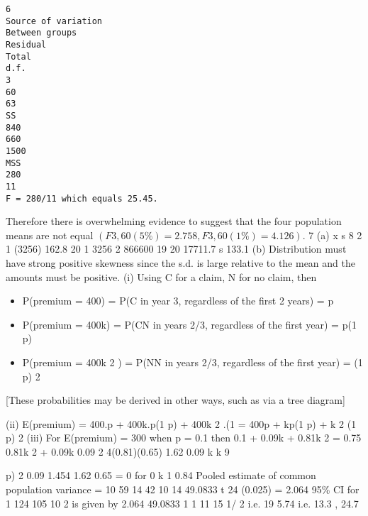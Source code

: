 \documentclass[a4paper,12pt]{article}
\begin{document}
\begin{verbatim}
6
Source of variation
Between groups
Residual
Total
d.f.
3
60
63
SS
840
660
1500
MSS
280
11
F = 280/11 which equals 25.45.

\end{verbatim}
Therefore there is overwhelming evidence to suggest that the four population
means are not equal $(F 3,60 (5\%) = 2.758, F 3,60 (1\%) = 4.126)$.
7
(a)
x
s
8
2
1
(3256) 162.8
20
1
3256 2
866600
19
20
17711.7
s 133.1
(b) Distribution must have strong positive skewness
since the s.d. is large relative to the mean and the amounts must be positive.
(i) Using C for a claim, N for no claim, then
\begin{itemize}
\item P(premium = 400) = P(C in year 3, regardless of the first 2 years) = p
\item P(premium = 400k) = P(CN in years 2/3, regardless of the first year) = p(1 p)
\item P(premium = 400k 2 ) = P(NN in years 2/3, regardless of the first year) = (1 p) 2
\end{itemize}

[These probabilities may be derived in other ways, such as via a tree diagram]



(ii) E(premium) = 400.p + 400k.p(1 p) + 400k 2 .(1
= 400{p + kp(1 p) + k 2 (1 p) 2 }
(iii) For E(premium) = 300 when p = 0.1
then 0.1 + 0.09k + 0.81k 2 = 0.75
0.81k 2 + 0.09k
0.09 2 4(0.81)(0.65)
1.62
0.09
k
k
9

p) 2
0.09 1.454
1.62
0.65 = 0
for 0 k 1
0.84
Pooled estimate of common population variance =
10 59
14 42
10 14
49.0833
t 24 (0.025) = 2.064
95\%  CI for
1
124 105
10
2
is given by
2.064
49.0833
1 1
11 15
1/ 2
i.e. 19 5.74 i.e. 13.3 , 24.7
\end{document}
